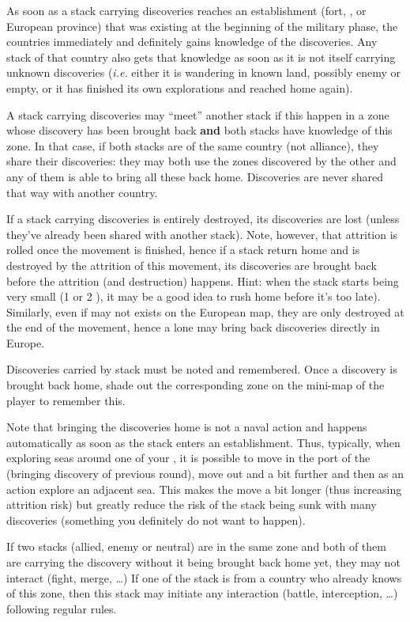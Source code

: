 As soon as a stack carrying discoveries reaches an establishment (fort, \TP,
\COL or European province) that was existing at the beginning of the military
phase, the countries immediately and definitely gains knowledge of the
discoveries. Any stack of that country also gets that knowledge as soon as it
is not itself carrying unknown discoveries (\emph{i.e.} either it is wandering
in known land, possibly enemy or empty, or it has finished its own
explorations and reached home again).

A stack carrying discoveries may ``meet'' another stack if this happen in a
zone whose discovery has been brought back \textbf{and} both stacks have
knowledge of this zone. In that case, if both stacks are of the same country
(not alliance), they share their discoveries: they may both use the zones
discovered by the other and any of them is able to bring all these back
home. Discoveries are never shared that way with another country.

If a stack carrying discoveries is entirely destroyed, its discoveries are
lost (unless they've already been shared with another stack). Note, however,
that attrition is rolled once the movement is finished, hence if a stack
return home and is destroyed by the attrition of this movement, its
discoveries are brought back before the attrition (and destruction)
happens. Hint: when the stack starts being very small (1 or 2 \NDE), it may be
a good idea to rush home before it's too late). Similarly, even if \LDE may
not exists on the European map, they are only destroyed at the end of the
movement, hence a lone \LDE may bring back discoveries directly in Europe.

Discoveries carried by stack must be noted and remembered. Once a discovery is
brought back home, shade out the corresponding zone on the mini-map of the
player to remember this.

Note that bringing the discoveries home is not a naval action and happens
automatically as soon as the stack enters an establishment. Thus, typically,
when exploring seas around one of your \COL, it is possible to move in the
port of the \COL (bringing discovery of previous round), move out and a bit
further and then as an action explore an adjacent sea. This makes the move a
bit longer (thus increasing attrition risk) but greatly reduce the risk of the
stack being sunk with many discoveries (something you definitely do not want
to happen).

If two stacks (allied, enemy or neutral) are in the same zone and both of them
are carrying the discovery without it being brought back home yet, they may
not interact (fight, merge, \ldots) If one of the stack is from a country who
already knows of this zone, then this stack may initiate any interaction
(battle, interception, \ldots) following regular rules.

